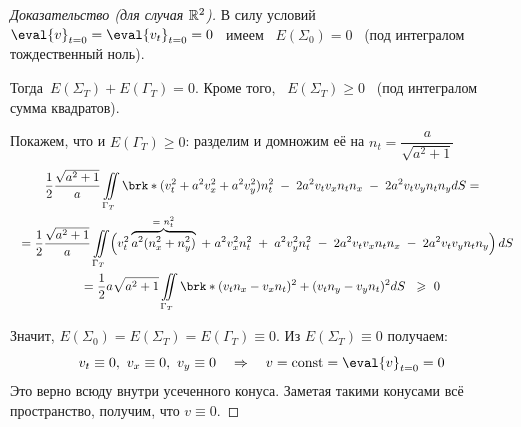 \documentclass[../main.tex]{subfiles}
\begin{document}
\begin{proof}[Доказательство (для случая $\mathbb{R}^2$)]
В силу условий $ \eval{v}_{t=0} = \eval{v_t}_{t=0} = 0$ \ имеем \ $ E(\Sigma_0)=0 $ \ (под интегралом тождественный ноль).

Тогда\, $ E(\Sigma_T)+E(\Gamma_T)=0 $.\: 
Кроме того, \ $ E(\Sigma_T)\geq 0 $ \ (под интегралом сумма квадратов).
\vspace{0.5em}

Покажем, что и $ E(\Gamma_T)\geq 0 $: разделим и домножим её на $ n_t=\dfrac{a}{\sqrt{a^2+1}} $
\begin{multline*}
  \frac{1}{2}\frac{\sqrt{a^2+1}}{a}\iint\limits_{\Gamma_T}\brk*{(v^2_t+a^2v^2_x+a^2v^2_y)n^2_t \; - \; 2a^2v_tv_xn_tn_x \; - \; 2a^2v_tv_yn_tn_y} dS = \\ \shoveleft{
  =\frac{1}{2}\frac{\sqrt{a^2+1}}{a}\iint\limits_{\Gamma_T} \Bigl( v^2_t \overbrace{a^2(n^2_x + n^2_y)}^\text{= $n_t^2$}\; + \; a^2v^2_xn^2_t \; + \; a^2v^2_yn^2_t\; - \; 2a^2v_tv_xn_tn_x \; - \; 2a^2 v_t v_y n_t n_y \Bigr)\, dS }\\
  = \frac{1}{2} a \sqrt{a^2+1} \iint\limits_{\Gamma_T} \brk*{(v_tn_x -v_xn_t)^2+(v_tn_y-v_yn_t)^2} dS \;\ \geq\ 0  
\end{multline*}

Значит,\; $ E(\Sigma_0)=E(\Sigma_T)=E(\Gamma_T)\equiv 0.$
\; Из $ E(\Sigma_T)\equiv 0 $ получаем: 
$$ v_t\equiv 0,\ v_x\equiv 0,\ v_y\equiv 0 \quad \Rightarrow \quad v = \text{const} = \eval{v}_{t=0} = 0 
$$
Это верно всюду внутри усеченного конуса.
Заметая такими конусами всё пространство, получим, что $ v \equiv 0 $.
\end{proof}
\end{document}

